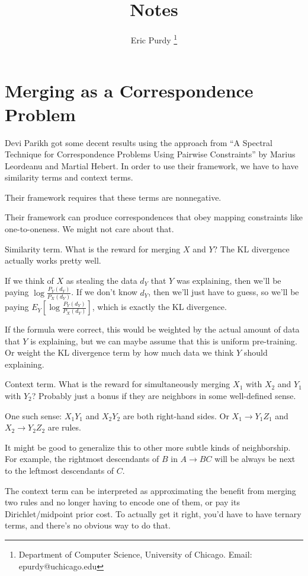 \documentclass{article}
\title{Notes}
\author{Eric Purdy \footnote{Department of Computer Science, University of Chicago. Email: epurdy@uchicago.edu}}
\begin{document}
\maketitle

\section{Merging as a Correspondence Problem}

Devi Parikh got some decent results using the approach from ``A
Spectral Technique for Correspondence Problems Using Pairwise
Constraints'' by Marius Leordeanu and Martial Hebert. In order to use
their framework, we have to have similarity terms and context terms.

Their framework requires that these terms are nonnegative. 

Their framework can produce correspondences that obey mapping
constraints like one-to-oneness. We might not care about that.

\bitem
\item Similarity term. What is the reward for merging $X$ and $Y$? 
  The KL divergence actually works pretty well.

  If we think of $X$ as stealing the data $d_Y$ that $Y$ was
  explaining, then we'll be paying $\log
  \frac{P_Y(d_Y)}{P_X(d_Y)}$. If we don't know $d_Y$, then we'll just
  have to guess, so we'll be paying $E_Y \left[ \log
    \frac{P_Y(d_Y)}{P_X(d_Y)} \right]$, which is exactly the KL
  divergence.

  If the formula were correct, this would be weighted by the actual
  amount of data that $Y$ is explaining, but we can maybe assume that
  this is uniform pre-training. Or weight the KL divergence term by
  how much data we think $Y$ should explaining.

\item Context term. What is the reward for simultaneously merging
  $X_1$ with $X_2$ and $Y_1$ with $Y_2$? Probably just a bonus if they
  are neighbors in some well-defined sense.

  One such sense: $X_1 Y_1$ and $X_2 Y_2$ are both right-hand
  sides. Or $X_1 \to Y_1 Z_1$ and $X_2 \to Y_2 Z_2$ are rules.

  It might be good to generalize this to other more subtle kinds of
  neighborship. For example, the rightmost descendants of $B$ in $A\to
  BC$ will be always be next to the leftmost descendants of $C$.

  The context term can be interpreted as approximating the benefit
  from merging two rules and no longer having to encode one of them,
  or pay its Dirichlet/midpoint prior cost. To actually get it right,
  you'd have to have ternary terms, and there's no obvious way to do
  that.
\end{document}
